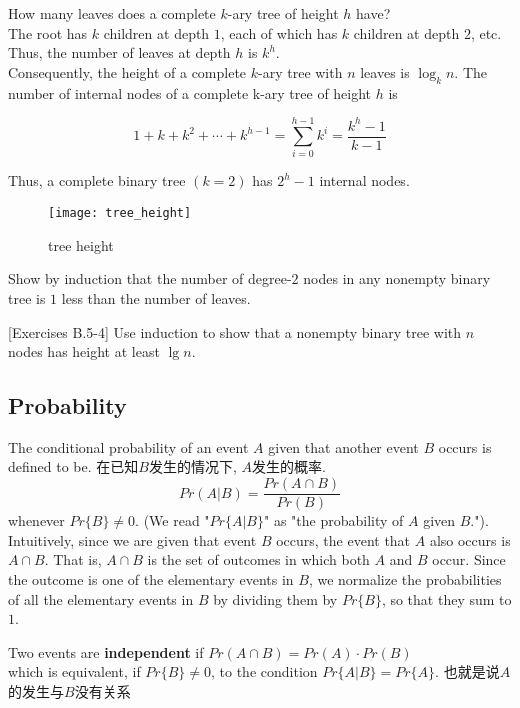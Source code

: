 \documentclass{article}
\begin{document}
How many leaves does a complete $k$-ary tree of height $h$ have? \\
The root has $k$ children at depth $1$, each of which has $k$ children at depth $2$, etc. \\
Thus, the number of leaves at depth $h$ is $k^h$. \\
Consequently, the height of a complete $k$-ary tree with $n$ leaves is $\log_k n$. The number of internal nodes of a complete k-ary tree of height $h$ is

$$
1 + k + k^2 + \cdots + k^{h-1} = \sum_{i=0}^{h-1} k^i = \frac{k^h - 1}{k-1}
$$

Thus, a complete binary tree $(k=2)$ has $2^h - 1$ internal nodes.
\begin{figure}[htbp]
  \centering
  \texttt{[image: tree\_height]}\\
  \caption{tree height}\label{fig.tree.height}
\end{figure}

\bigskip
[Exercises B.5-3] Show by induction that the number of degree-$2$ nodes in any nonempty binary tree is $1$ less than the number of leaves.

[Exercises B.5-4] Use induction to show that a nonempty binary tree with $n$ nodes has height at least $\lg n$.

\subsection{Probability}
The conditional probability of an event $A$ given that another event $B$ occurs is defined to be.
在已知$B$发生的情况下, $A$发生的概率.
$$
Pr(A|B) = \dfrac{Pr(A \cap B)}{Pr(B)}
$$
whenever $Pr\{B\} \neq 0$. (We read "$Pr\{A | B\}$" as "the probability of $A$ given $B$.").
Intuitively, since we are given that event $B$ occurs, the event that $A$ also occurs is $A \cap B$. That is, $A \cap B$ is the set of outcomes in which both $A$ and $B$ occur.
Since the outcome is one of the elementary events in $B$, we normalize the probabilities of all the elementary events in $B$ by dividing them by $Pr\{B\}$, so that they sum to $1$.

\bigskip
Two events are \textbf{independent} if $Pr(A \cap B) = Pr(A)\cdot Pr(B)$ \\
which is equivalent, if $Pr\{B\} \neq 0$, to the condition $Pr\{A | B\} = Pr\{A\}$.
也就是说$A$的发生与$B$没有关系
\end{document}
